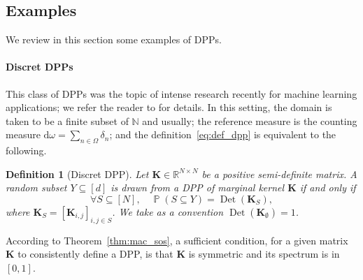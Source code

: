 \documentclass[twoside,11pt]{book}
\newtheorem{definition}{Definition}
\numberwithin{theorem}{chapter}
\numberwithin{definition}{chapter}
\numberwithin{proposition}{chapter}
\numberwithin{corollary}{chapter}
\numberwithin{example}{chapter}
\numberwithin{lemma}{chapter}
\numberwithin{assumption}{chapter}
\DeclareMathOperator{\Det}{Det}
\DeclareMathOperator{\Prb}{\mathbb{P}}
\begin{document}






\subsection{Examples}\label{sec:DPP_examples}
We review in this section some examples of DPPs.
\paragraph{Discret DPPs}

This class of DPPs was the topic of intense research recently for machine learning applications; we refer the reader to \citep{KuTa12} for details. In this setting, the domain is taken to be a finite subset of $\mathbb{N}$ and usually; the reference measure is the counting measure $\mathrm{d}\omega = \sum\limits_{n \in \Omega} \delta_{n}$; and the definition~\eqref{eq:def_dpp} is equivalent to the following.


\begin{definition}[Discret DPP]
Let $\bm{K} \in \mathbb{R}^{N\times N}$ be a positive semi-definite matrix.
A random subset $Y \subseteq [d]$ is drawn from a DPP of marginal kernel $\bm{K}$ if and only if
\begin{equation}\label{eq:def_dpp}
\forall S \subseteq [N],\quad \Prb(S \subseteq Y) = \Det(\bm{K}_{S}),
\end{equation}
where $\bm{K}_{S} = [\bm{K}_{i,j}]_{i,j \in S}$. We take as a convention $\Det(\bm{K}_{\emptyset}) = 1$.
\end{definition}

According to Theorem~\ref{thm:mac_sos}, a sufficient condition, for a given matrix $\bm{K}$ to consistently define a DPP, is that $\bm{K}$ is symmetric and its spectrum is in $[0,1]$.
\end{document}

